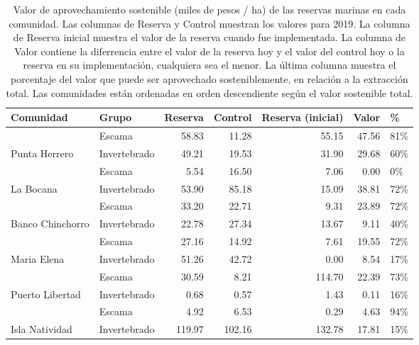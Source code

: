 \begin{table}[!h]

\caption{\label{tab:sust_val}Valor de aprovechamiento sostenible (miles de pesos / ha) de las reservas marinas en cada comunidad. Las columnas de Reserva y Control muestran los valores para 2019. La columna de Reserva inicial muestra el valor de la reserva cuando fue implementada. La columna de Valor contiene la diferrencia entre el valor de la reserva hoy y el valor del control hoy o la reserva en su implementación, cualquiera sea el menor. La última columna muestra el porcentaje del valor que puede ser aprovechado sosteniblemente, en relación a la extracción total. Las comunidades están ordenadas en orden descendiente según el valor sostenible total.}
\centering
\begin{tabular}[t]{llrrrrl}
\toprule
Comunidad & Grupo & Reserva & Control & Reserva (inicial) & Valor & \%\\
\midrule
 & Escama & 58.83 & 11.28 & 55.15 & 47.56 & 81\%\\
\cmidrule{2-7}
\multirow{-2}{*}{\raggedright\arraybackslash Punta Herrero} & Invertebrado & 49.21 & 19.53 & 31.90 & 29.68 & 60\%\\
\cmidrule{1-7}
 & Escama & 5.54 & 16.50 & 7.06 & 0.00 & 0\%\\
\cmidrule{2-7}
\multirow{-2}{*}{\raggedright\arraybackslash La Bocana} & Invertebrado & 53.90 & 85.18 & 15.09 & 38.81 & 72\%\\
\cmidrule{1-7}
 & Escama & 33.20 & 22.71 & 9.31 & 23.89 & 72\%\\
\cmidrule{2-7}
\multirow{-2}{*}{\raggedright\arraybackslash Banco Chinchorro} & Invertebrado & 22.78 & 27.34 & 13.67 & 9.11 & 40\%\\
\cmidrule{1-7}
 & Escama & 27.16 & 14.92 & 7.61 & 19.55 & 72\%\\
\cmidrule{2-7}
\multirow{-2}{*}{\raggedright\arraybackslash Maria Elena} & Invertebrado & 51.26 & 42.72 & 0.00 & 8.54 & 17\%\\
\cmidrule{1-7}
 & Escama & 30.59 & 8.21 & 114.70 & 22.39 & 73\%\\
\cmidrule{2-7}
\multirow{-2}{*}{\raggedright\arraybackslash Puerto Libertad} & Invertebrado & 0.68 & 0.57 & 1.43 & 0.11 & 16\%\\
\cmidrule{1-7}
 & Escama & 4.92 & 6.53 & 0.29 & 4.63 & 94\%\\
\cmidrule{2-7}
\multirow{-2}{*}{\raggedright\arraybackslash Isla Natividad} & Invertebrado & 119.97 & 102.16 & 132.78 & 17.81 & 15\%\\

\end{tabular}
\end{table}
